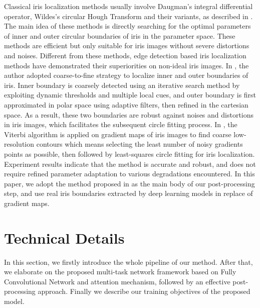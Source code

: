 \documentclass[journal]{IEEEtran}
\begin{document}
Classical iris localization methods usually involve Daugman's integral differential operator\cite{Daugman_id}, Wildes's circular Hough Transform\cite{wildes1997iris} and their variants, as described in . The main idea of these methods is directly searching for the optimal parameters of inner and outer circular boundaries of iris in the parameter space. These methods are efficient but only suitable for iris images without severe distortions and noises. Different from these methods, edge detection based iris localization methods have demonstrated their superiorities on non-ideal iris images. In \cite{gangwar2016irisseg}, the author adopted coarse-to-fine strategy to localize inner and outer boundaries of iris. Inner boundary is coarsely detected using an iterative search method by exploiting dynamic thresholds and multiple local cues, and outer boundary is first approximated in polar space using adaptive filters, then refined in the cartesian space. As a result, these two boundaries are robust against noises and distortions in iris images, which facilitates the subsequent circle fitting process. In \cite{Sutra2012The}, the Viterbi algorithm is applied on gradient maps of iris images to find coarse low-resolution contours which means selecting the least number of noisy gradients points as possible, then followed by least-squares circle fitting\cite{chernov2005least} for iris localization. Experiment results indicate that the method is accurate and robust, and does not require refined parameter adaptation to various degradations encountered. In this paper, we adopt the method proposed in \cite{Sutra2012The} as the main body of our post-processing step, and use real iris boundaries extracted by deep learning models in replace of gradient maps.


\section{Technical Details}
In this section, we firstly introduce the whole pipeline of our method. After that, we elaborate on the proposed multi-task network framework based on Fully Convolutional Network and attention mechanism, followed by an effective post-processing approach. Finally we describe our training objectives of the proposed model.
\end{document}

